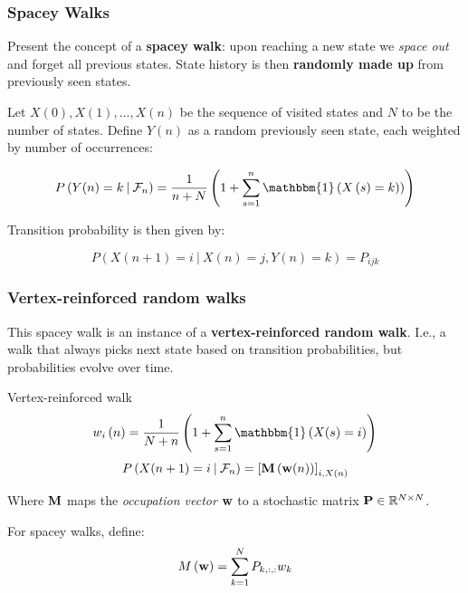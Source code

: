 \documentclass{beamer}
\begin{document}
\begin{frame}
\frametitle{Spacey Walks}

Present the concept of a \textbf{spacey walk}: upon reaching a new state we \textit{space out} and forget all previous states.  State history is then \textbf{randomly made up} from previously seen states.

\begin{block}{}

Let $X\left(0\right), X\left(1\right), \ldots, X\left(n\right)$ be the sequence of visited states and $N$ to be the number of states.  Define $Y\left(n\right)$ as a random previously seen state, each weighted by number of occurrences:

\begin{equation*}
P\left(Y(n) = k \:|\: \mathcal{F}_n \right) = \frac{1}{n+N}\left(1 + \sum_{s=1}^n \mathbbm{1}\left(X\left(s) = k\right) \right) \right)
\end{equation*}

Transition probability is then given by:

\begin{equation*}
P\left(X\left(n+1\right) = i \:|\: X(n) = j, Y(n) = k\right) = P_{ijk}
\end{equation*}

\end{block}

\end{frame}


\begin{frame}
  \frametitle{Vertex-reinforced random walks}
  This spacey walk is an instance of a \textbf{vertex-reinforced random walk}.  I.e., a walk that always picks next state based on transition probabilities, but probabilities evolve over time.

  \begin{block}{Vertex-reinforced walk}
    \begin{equation*}
      w_i\left(n\right) = \frac{1}{N+n}\left(1 + \sum_{s=1}^n \mathbbm{1}\left(X(s)=i\right) \right)
    \end{equation*}
    \begin{equation*}
      P\left(X(n+1) = i \:|\: \mathcal{F}_n\right) = \left[{\bf M} \left({\bf w}(n)\right)\right]_{i,X\left(n\right)}
    \end{equation*}

    Where ${\bf M}$ maps the \textit{occupation vector} ${\bf w}$ to a stochastic matrix ${\bf P}\in\mathbb{R}^{N\times N}$.
  \end{block}

  For spacey walks, define:
  \[ M\left({\bf w}\right) = \sum_{k=1}^N P_{k,:,:} w_k \]
\end{frame}
\end{document}
